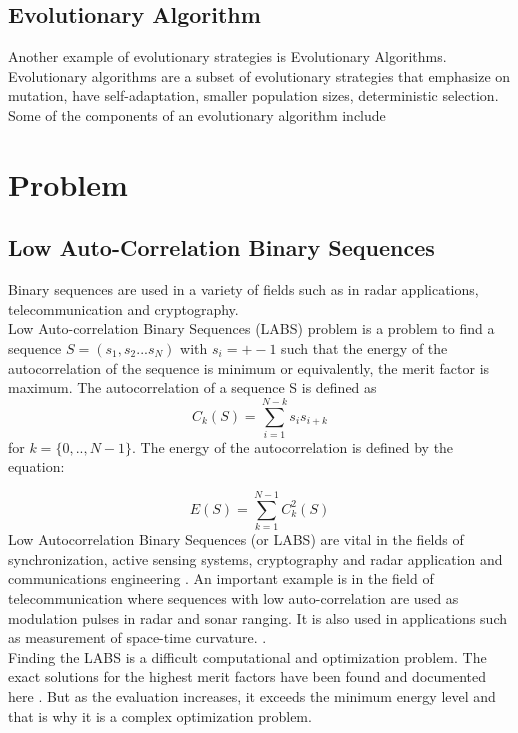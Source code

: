 \documentclass{article}
\begin{document}
\subsection{Evolutionary Algorithm}
Another example of evolutionary strategies is Evolutionary Algorithms. Evolutionary algorithms are a subset of evolutionary strategies that emphasize on mutation, have self-adaptation, smaller population sizes, deterministic selection. \\
Some of the components of an evolutionary algorithm include

\section{Problem}
\subsection{Low Auto-Correlation Binary Sequences}\label{sec:labs}
Binary sequences are used in a variety of fields such as in radar applications, telecommunication and cryptography. \\
Low Auto-correlation Binary Sequences (LABS) problem is a problem to find a sequence $S = (s_1, s_2 ... s_N)$ with $ s_i = +-1$ such that the energy of the autocorrelation of the sequence is minimum or equivalently, the merit factor is maximum.  The autocorrelation of a sequence S is defined as 
\begin{equation*}
    C_k(S) = \sum_{i=1}^{N-k}s_is_{i+k}
\end{equation*}
for $k  = \{0,..,N-1\}$. The energy of the autocorrelation is defined by the equation: 

\begin{equation*}
    E(S) = \sum_{k=1}^{N-1}C_k^2(S)
\end{equation*}
Low Autocorrelation Binary Sequences (or LABS) are vital in the fields of  synchronization, active sensing systems, cryptography and radar application and communications engineering \cite{9422706}. An important example is in the field of telecommunication where sequences with low auto-correlation are used as modulation pulses in radar and sonar ranging. It is also used in applications such as measurement of space-time curvature. \cite{Packebusch_2016}.\\
Finding the LABS is a difficult computational and optimization problem. The exact solutions for the highest merit factors have been found and documented here \cite{Ukil_2010}. But as the evaluation increases, it exceeds the minimum energy level and that is why it is a complex optimization problem.\\
\end{document}
